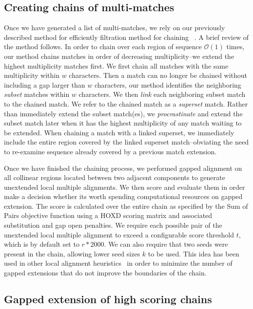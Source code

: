 \documentclass[twoside,11pt]{article}
\begin{document}
\subsection{Creating chains of multi-matches}

Once we have generated a list of multi-matches, we rely on our previously described method for efficiently filtration method for chaining ~\cite{ref-procrast}. A brief review of the method follows. In order to chain over each region of sequence $\mathcal{O}(1)$ times,
our method chains matches in order of decreasing multiplicity--we
extend the highest multiplicity matches first. We first chain all matches
with the same multiplicity within $w$
characters. Then a match can no
longer be chained without including a gap larger than $w$
characters, our method identifies the neighboring \textit{subset}
matches within $w$ characters. We then \textit{link} each
neighboring subset match to the chained match. We refer to the
chained match as a \textit{superset} match. Rather than immediately
extend the subset match(es), we \textit{procrastinate} and extend
the subset match later when it has the highest multiplicity of any
match waiting to be extended. When chaining a match with a linked
superset, we immediately include the entire region covered by the linked superset
match--obviating the need to re-examine sequence already covered by
a previous match extension.

Once we have finished the chaining process, we performed gapped alignment on all collinear regions located between two adjacent components to generate unextended local multiple alignments. We then score and evaluate them in order make a decision whether its worth spending computational resources on gapped extension. The score is calculated over the entire chain as specified by the Sum of Pairs objective function using a HOXD scoring matrix and associated substitution and gap open penalties. We require each possible pair of the unextended local multiple alignment to exceed a configurable score threshold $t$, which is by default set to $r*2000$. We can also require that two seeds were present in the chain, allowing lower seed sizes $k$ to be used. This idea has been used in other local alignment heuristics~\cite{ref-blastz,ref-gappedblast,ref-blat} in order to minimize the number of gapped extensions that do not improve the boundaries of the chain.

\subsection{Gapped extension of high scoring chains}
\end{document}
